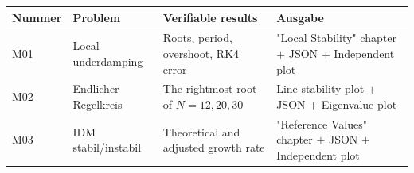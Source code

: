 \documentclass[11pt,a4paper,openany]{book}
\numberwithin{equation}{chapter}
\numberwithin{figure}{chapter}
\numberwithin{table}{chapter}
\begin{document}
\begin{center}
\small
{}
\label{tab:open-results}
\begin{tabular}{p{1.1cm}p{3.5cm}p{4.4cm}p{4.4cm}}
\toprule
\textbf{Nummer} & \textbf{Problem} & \textbf{Verifiable results} & \textbf{Ausgabe} \\
\midrule
M01 &






Local underdamping






&






Roots, period, overshoot, RK4 error






&






"Local Stability" chapter $+$ JSON $+$ Independent plot





\\
M02 &




 Endlicher Regelkreis




&






The rightmost root of $N=12,20,30$

&

Line stability plot $+$ JSON $+$ Eigenvalue plot





\\
M03 &




 IDM stabil/instabil




&






Theoretical and adjusted growth rate






&






"Reference Values" chapter $+$ JSON $+$ Independent plot






\end{tabular}
\end{center}
\end{document}
